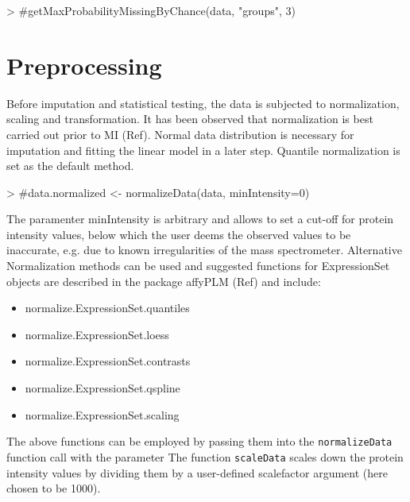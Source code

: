 \documentclass[a4paper,11pt]{article}
\newcommand{\Rfunction}[1]{{\texttt{#1}}}
\begin{document}
\begin{Schunk}
\begin{Sinput}
> #getMaxProbabilityMissingByChance(data, "groups", 3)
\end{Sinput}
\end{Schunk}

\section{Preprocessing}

Before imputation and statistical testing, the data is subjected to normalization, scaling and transformation.
It has been observed that normalization is best carried out prior to MI (Ref). Normal data distribution 
is necessary for imputation and fitting the linear model in a later step. Quantile normalization is set as the default method. 

\begin{Schunk}
\begin{Sinput}
> #data.normalized <- normalizeData(data, minIntensity=0)
\end{Sinput}
\end{Schunk}

The paramenter minIntensity is arbitrary and allows to set a cut-off for protein intensity values, below which the user deems the observed values to be inaccurate, e.g. due to known irregularities of the mass spectrometer.
Alternative Normalization methods can be used and suggested functions for ExpressionSet objects are described 
in the package affyPLM (Ref) and include:

\begin{itemize}
   \item normalize.ExpressionSet.quantiles
   \item normalize.ExpressionSet.loess
   \item normalize.ExpressionSet.contrasts
   \item normalize.ExpressionSet.qspline
   \item normalize.ExpressionSet.scaling
\end{itemize}

The above functions can be employed by passing them into the \Rfunction{normalizeData} function call with the parameter The function \Rfunction{scaleData} scales down the protein intensity values by dividing them by a user-defined scalefactor argument (here chosen to be 1000).
\end{document}
